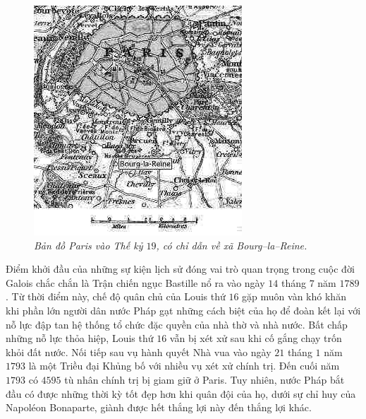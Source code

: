 \begin{multicols}{2}
\begin{figure}[H]
		\includegraphics[width= 1\linewidth]{2}
		\caption{\small\textit{\color{lichsutoanhoc}Bản đồ Paris vào Thế kỷ $19$, có chỉ dẫn về xã Bourg--la--Reine.}}
		\vspace*{-10pt}
	\end{figure}
	Điểm khởi đầu của những sự kiện lịch sử đóng vai trò quan trọng trong cuộc đời Galois chắc chắn là Trận chiến  ngục Bastille nổ ra vào ngày $14$ tháng $7$ năm $1789$. Từ thời điểm này, chế độ quân chủ của Louis thứ $16$ gặp muôn vàn khó khăn khi phần lớn người dân nước Pháp gạt những cách biệt của họ để đoàn kết lại với nỗ lực đập tan hệ thống tổ chức đặc quyền của nhà thờ và nhà nước.
	\vskip 0.1cm
	Bất chấp những nỗ lực thỏa hiệp, Louis thứ $16$ vẫn bị xét xử sau khi cố gắng chạy trốn khỏi đất nước. Nối tiếp sau vụ hành quyết Nhà vua vào ngày $21$ tháng $1$ năm $1793$ là một Triều đại Khủng bố với nhiều vụ xét xử chính trị. Đến cuối năm $1793$ có $4595$ tù nhân chính trị bị giam giữ ở Paris. Tuy nhiên, nước Pháp bắt đầu có được những thời kỳ tốt đẹp hơn khi quân đội của họ, dưới sự chỉ huy của Napoléon Bonaparte, giành được hết  thắng lợi này đến  thắng lợi khác.
	\vskip 0.1cm

\end{multicols}
